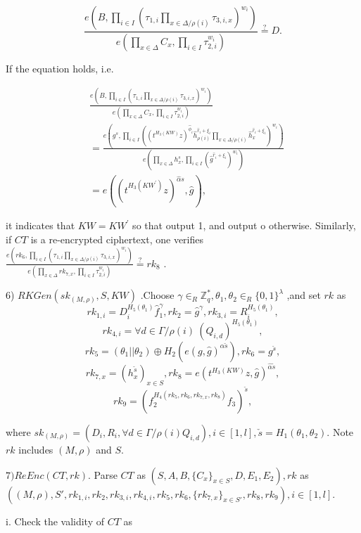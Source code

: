 \documentclass[runningheads]{llncs}
\begin{document}
$$\frac{e\left(B,\prod_{i\in I}\left(\tau_{1,i}\prod_{x\in\Delta/\rho(i)}\tau_{3,i,x}\right)^{w_i}\right)}{e\left(\prod_{x\in\Delta}C_x,\prod_{i\in I}\tau_{2,i}^{w_i}\right)}\overset{?}{\operatorname*{=}}D.$$

If the equation holds, i.e.

$$\begin{aligned}&\frac{e\left(B,\prod_{i\in I}\left(\tau_{1,i}\prod_{x\in\Delta/\rho(i)}\tau_{3,i,x}\right)^{w_i}\right)}{e\left(\prod_{x\in\Delta}C_x,\prod_{i\in I}\tau_{2,i}^{w_i}\right)}\\&=\frac{e\left(g^s,\prod_{i\in I}\left((t^{H_3(KW)}z)^{\hat{\phi}_i}\hat{h}_{\rho(i)}^{\hat{r}_i+\xi_i}\prod_{x\in\Delta/\rho(i)}\hat{h}_x^{\hat{r}_i+\xi_i}\right)^{w_i}\right)}{e\left(\prod_{x\in\Delta}h_x^s,\prod_{i\in I}(\hat{g}^{\hat{r}_i+\xi_i})^{w_i}\right)}\\&=e((t^{H_3(KW^{\prime})}z)^{\hat{\alpha}s},\hat{g}),\end{aligned}$$

it indicates that $KW=KW^{\prime}$ so that output 1, and output o otherwise. Similarly, if $CT$ is a re-encrypted
ciphertext, one verifies $\frac {e\left ( rk_6, \prod _{i\in I}\left ( \tau _{1, i}\prod _{x\in \Delta / \rho ( i) }\tau _{3, i, x}\right ) ^{w_i}\right ) }{e\left ( \prod _{x\in \Delta }rk_{7, x}, \prod _{i\in I}\tau _{2, i}^{w_i}\right ) }\overset {? }{\operatorname* { \operatorname* { = } } }rk_8$ .

6) $RKGen(sk_{(M,\rho)},S,KW)$ .Choose $\gamma\in_R\mathbb{Z}_q^*,\theta_1,\theta_2\in_R\{0,1\}^\lambda$ ,and set $rk$ as
$$rk_{1,i}=D_{i}^{{H_{5}(\theta_{1})}}\hat{f}_{1}^{\gamma},rk_{2}=\hat{g}^{\gamma},rk_{3,i}=R_{i}^{{H_{5}(\theta_{1})}},$$
$$rk_{4,i}=\forall d\in\Gamma/\rho(i)\mathrm{~}(Q_{i,d})^{H_5(\theta_1)},$$
$$rk_5=(\theta_1||\theta_2)\oplus H_2(e(g,\hat{g})^{\alpha\check{s}}),rk_6=g^{\check{s}},$$
$$rk_{7,x}=(h_x^{\breve{s}})_{x\in S},rk_8=e(t^{H_3(KW)}z,\hat{g})^{\hat{\alpha}\check{s}},$$
$$rk_{9}=(f_{2}^{{H_{4}(rk_{5},rk_{6},rk_{7,x},rk_{8})}}f_{3})^{{\check{s}}},$$


where $sk_{(M,\rho)}=\left(D_i,R_i,\forall d\in\Gamma/\rho(i)Q_{i,d}\right),i\in\left[1,l\right],\check{s}=H_1(\theta_1,\theta_2).$ Note $rk$ includes $(M,\rho)$ and $S.$

$7) ReEnc(CT,rk).$ Parse $CT$ as $(S, A, B, \{C_x\}_{x\in S}, D, E_1, E_2), rk$ as $((M,\rho), S', rk_{1,i}, rk_2, rk_{3,i}, rk_{4,i}, rk_5, rk_6, \{rk_{7,x}\}_{x\in S'}, rk_8, rk_9), i \in [1,l].$

i. Check the validity of $CT$ as
\end{document}
